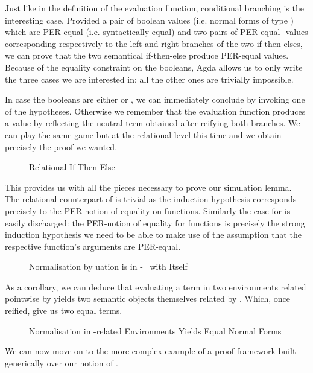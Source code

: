 Just like in the definition of the evaluation function, conditional branching is the
interesting case. Provided a pair of boolean values (i.e. normal forms of type
) which are PER-equal (i.e. syntactically equal) and two pairs of PER-equal
-values corresponding respectively to the left and right branches of the two
if-then-elses, we can prove that the two semantical if-then-else produce PER-equal values.
Because of the equality constraint on the booleans, Agda allows us to only write the
three cases we are interested in: all the other ones are trivially impossible.

In case the booleans are either  or , we can immediately conclude
by invoking one of the hypotheses. Otherwise we remember that the evaluation function
produces a value by reflecting the neutral term obtained after reifying both branches.
We can play the same game but at the relational level this time and we obtain precisely
the proof we wanted.

\begin{figure}[h]
\caption{Relational If-Then-Else\label{fig:nbeiftenelser}}
\end{figure}

This provides us with all the pieces necessary to prove our simulation lemma. The relational
counterpart of  is trivial as the induction hypothesis corresponds precisely to
the PER-notion of equality on functions. Similarly the case for  is easily discharged:
the PER-notion of equality for functions is precisely the strong induction hypothesis we need
to be able to make use of the assumption that the respective function's arguments are PER-equal.

\begin{figure}[h]
\caption{Normalisation by uation is in -~ with Itself\label{fig:nbeselfsim}}
\end{figure}

As a corollary, we can deduce that evaluating a term in two environments related pointwise
by  yields two semantic objects themselves related by . Which, once reified,
give us two equal terms.

\begin{figure}[h]
\caption{Normalisation in -related Environments Yields Equal Normal Forms}
\end{figure}

We can now move on to the more complex example of a proof framework built generically
over our notion of .
